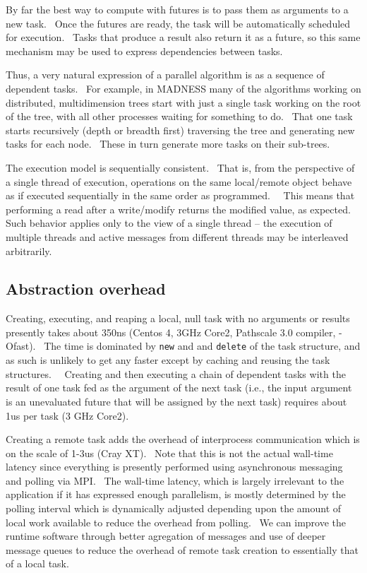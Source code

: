 \documentclass[letterpaper]{article}
\begin{document}
By far the best way to compute with futures is to pass them as arguments to a new task. \ Once the futures are ready,
the task will be automatically scheduled for execution. \ Tasks that produce a result also return it as a future, so
this same mechanism may be used to express dependencies between tasks.

Thus, a very natural expression of a parallel algorithm is as a sequence of dependent tasks. \ For example, in MADNESS
many of the algorithms working on distributed, multidimension trees start with just a single task working on the root
of the tree, with all other processes waiting for something to do. \ That one task starts recursively (depth or breadth
first) traversing the tree and generating new tasks for each node. \ These in turn generate more tasks on their
sub-trees.

The execution model is sequentially consistent. \ That is, from the perspective of a single thread of execution,
operations on the same local/remote object behave as if executed sequentially in the same order as programmed. \ \ This
means that performing a read after a write/modify returns the modified value, as expected. Such behavior applies only
to the view of a single thread -- the execution of multiple threads and active messages from different threads may be
interleaved arbitrarily.

\subsection{Abstraction overhead}
Creating, executing, and reaping a local, null task with no arguments or results presently takes about 350ns (Centos 4,
3GHz Core2, Pathscale 3.0 compiler, -Ofast). \ The time is dominated by \texttt{new} and and \texttt{delete} of the
task structure, and as such is unlikely to get any faster except by caching and reusing the task structures.
\ \ Creating and then executing a chain of dependent tasks with the result of one task fed as the argument of the next
task (i.e., the input argument is an unevaluated future that will be assigned by the next task) requires about 1us per
task (3 GHz Core2). \ 

Creating a remote task adds the overhead of interprocess communication which is on the scale of 1-3us (Cray XT). \ Note
that this is not the actual wall-time latency since everything is presently performed using asynchronous messaging and
polling via MPI. \ The wall-time latency, which is largely irrelevant to the application if it has expressed enough
parallelism, is mostly determined by the polling interval which is dynamically adjusted depending upon the amount of
local work available to reduce the overhead from polling. \ We can improve the runtime software through better
agregation of messages and use of deeper message queues to reduce the overhead of remote task creation to essentially
that of a local task.
\end{document}
